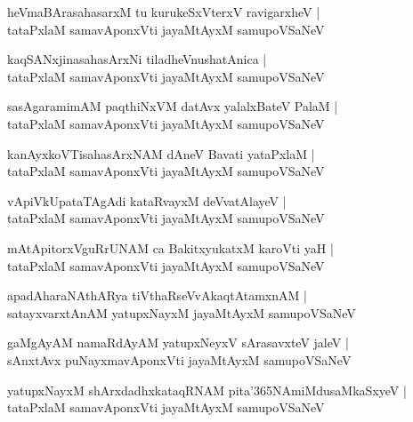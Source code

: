 \begin{shloka}
heVmaBArasahasarxM tu kurukeSxVterxV ravigarxheV |\\
tataPxlaM samavAponxVti jayaMtAyxM samupoVSaNeV
\end{shloka}

\begin{shloka}
kaqSANxjinasahasArxNi tiladheVnushatAnica |\\
tataPxlaM samavAponxVti jayaMtAyxM samupoVSaNeV
\end{shloka}

\begin{shloka}
sasAgaramimAM paqthiNxVM datAvx yalalxBateV PalaM |\\
tataPxlaM samavAponxVti jayaMtAyxM samupoVSaNeV
\end{shloka}

\begin{shloka}
kanAyxkoVTisahasArxNAM dAneV Bavati yataPxlaM |\\
tataPxlaM samavAponxVti jayaMtAyxM samupoVSaNeV
\end{shloka}

\begin{shloka}
vApiVkUpataTAgAdi kataRvayxM deVvatAlayeV |\\
tataPxlaM samavAponxVti jayaMtAyxM samupoVSaNeV
\end{shloka}

\begin{shloka}
mAtApitorxVguRrUNAM ca BakitxyukatxM karoVti yaH |\\
tataPxlaM samavAponxVti jayaMtAyxM samupoVSaNeV
\end{shloka}

\begin{shloka}
apadAharaNAthARya tiVthaRseVvAkaqtAtamxnAM |\\
satayxvarxtAnAM yatupxNayxM jayaMtAyxM samupoVSaNeV
\end{shloka}

\begin{shloka}
gaMgAyAM namaRdAyAM yatupxNeyxV sArasavxteV jaleV |\\
sAnxtAvx puNayxmavAponxVti jayaMtAyxM samupoVSaNeV
\end{shloka}

\begin{shloka}
yatupxNayxM shArxdadhxkataqRNAM pita\char'365NAmiMdusaMkaSxyeV |\\
tataPxlaM samavAponxVti jayaMtAyxM samupoVSaNeV
\end{shloka}

